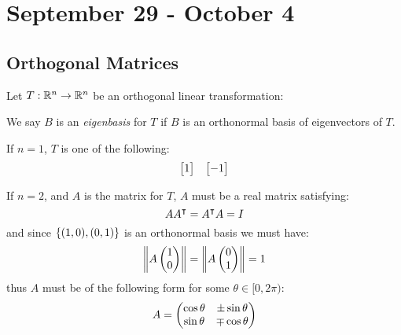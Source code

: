 \chapter{September 29 - October 4}

\section{Orthogonal Matrices}

Let $T : \mathbb{R}^n \to \mathbb{R}^n$ be an orthogonal linear transformation:

\begin{definition}
  We say $B$ is an \emph{eigenbasis} for $T$ if $B$ is an orthonormal basis of eigenvectors of $T$.
\end{definition}

\begin{remark}
  If $n=1$, $T$ is one of the following:
    \begin{align*}\begin{bmatrix}1\end{bmatrix} & & \begin{bmatrix}-1\end{bmatrix}\end{align*}
\end{remark}

\begin{remark}
  If $n=2$, and $A$ is the matrix for $T$, $A$ must be a real matrix satisfying:
    $$A{A}^{\intercal} = {A}^{\intercal}A = I$$
  and since $\left\{(1,0), (0,1)\right\}$ is an orthonormal basis we must have:
    $$\left\lVert A\begin{pmatrix}1 \\ 0\end{pmatrix}\right\rVert = \left\lVert A\begin{pmatrix}0 \\ 1\end{pmatrix}\right\rVert = 1$$
  thus $A$ must be of the following form for some $\theta \in [0,2\pi)$:
  $$A = \begin{pmatrix}
    \cos \theta & \pm \sin \theta \\
    \sin \theta & \mp \cos \theta
  \end{pmatrix}$$
\end{remark}


